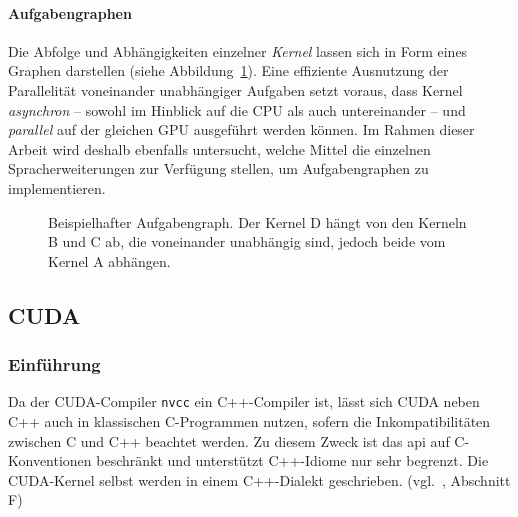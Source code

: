 \paragraph{Aufgabengraphen}

Die Abfolge und Abhängigkeiten einzelner \textit{Kernel} lassen sich in Form
eines Graphen darstellen (siehe
Abbildung~\ref{vergleich:anforderungen:aufgabensicht:graph}). Eine effiziente
Ausnutzung der Parallelität voneinander unabhängiger Aufgaben setzt voraus,
dass Kernel \textit{asynchron} -- sowohl im Hinblick auf die CPU als auch
untereinander -- und \textit{parallel} auf der gleichen GPU ausgeführt werden
können. Im Rahmen dieser Arbeit wird deshalb ebenfalls untersucht, welche Mittel
die einzelnen Spracherweiterungen zur Verfügung stellen, um Aufgabengraphen zu
implementieren.

\begin{figure}[htb]
    \centering
    \caption{Beispielhafter Aufgabengraph. Der Kernel D hängt von den Kerneln
             B und C ab, die voneinander unabhängig sind, jedoch beide vom
             Kernel A abhängen.}
    \label{vergleich:anforderungen:aufgabensicht:graph}
\end{figure}

\subsection{CUDA}
\label{vergleich:cuda}

\subsubsection{Einführung}
\label{vergleich:cuda:einfuehrung}

Da der CUDA-Compiler \texttt{nvcc} ein C++-Compiler ist, lässt sich CUDA neben
C++ auch in klassischen C-Programmen nutzen, sofern die Inkompatibilitäten
zwischen C und C++ beachtet werden. Zu diesem Zweck ist das \gls{api} auf
C-Konventionen beschränkt und unterstützt C++-Idiome nur sehr begrenzt. Die
CUDA-Kernel selbst werden in einem C++-Dialekt geschrieben.
(vgl.~\cite{cudaguide}, Abschnitt F)

